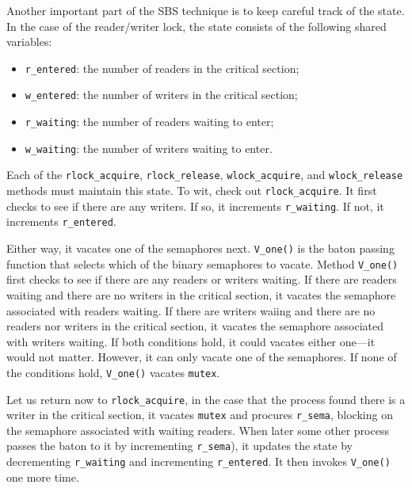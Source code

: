 \documentclass{report}
\begin{document}
Another important part of the SBS technique is to keep careful track of the
state.  In the case of the reader/writer lock, the state consists of the
following shared variables:
\begin{itemize}
\item \texttt{r\_entered}: the number of readers in the critical section;
\item \texttt{w\_entered}: the number of writers in the critical section;
\item \texttt{r\_waiting}: the number of readers waiting to enter;
\item \texttt{w\_waiting}: the number of writers waiting to enter.
\end{itemize}
Each of the
\texttt{rlock\_acquire}, \texttt{rlock\_release},
\texttt{wlock\_acquire}, and \texttt{wlock\_release} methods must maintain
this state.
To wit, check out \texttt{rlock\_acquire}.  It first checks to see if there
are any writers.  If so, it increments \texttt{r\_waiting}.  If not,
it increments \texttt{r\_entered}.

Either way, it vacates one of the semaphores next.
\texttt{V\_one()} is the baton passing function that selects which of the
binary semaphores to vacate.
Method \texttt{V\_one()} first checks to see if there are any readers or
writers waiting.  If there are readers waiting and there are no writers
in the critical section, it vacates the semaphore associated with
readers waiting.  If there are writers waiing and there are no readers
nor writers in the critical section, it vacates the semaphore associated
with writers waiting.  If both conditions hold, it could vacates either
one---it would not matter.  However, it can only vacate one of the semaphores.
If none of the conditions hold, \texttt{V\_one()} vacates \texttt{mutex}.

Let us return now to \texttt{rlock\_acquire}, in the case that the process
found there is a writer in the critical section, it vacates
\texttt{mutex} and procures \texttt{r\_sema},
blocking on the semaphore associated
with waiting readers.  When later some other process passes the baton to
it by incrementing \texttt{r\_sema}), it updates the state by decrementing
\texttt{r\_waiting} and incrementing \texttt{r\_entered}.  It
then invokes \texttt{V\_one()} one more time.
\end{document}
